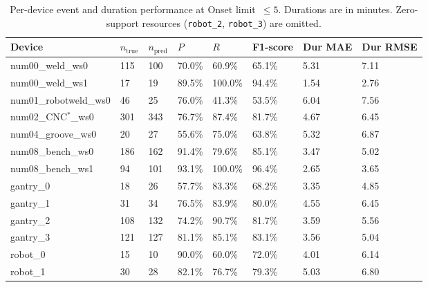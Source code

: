 \begin{table}[pos=!tbp]
\centering
\scriptsize
\setlength{\tabcolsep}{3pt}
\renewcommand{\arraystretch}{1.12}
\caption{Per-device event and duration performance at Onset limit~$\leq5$. Durations are in minutes. Zero-support resources (\texttt{robot\_2}, \texttt{robot\_3}) are omitted.}
\label{tab:complete-6-1}
\begin{tabularx}{\textwidth}{@{}lXXXXXXX@{}}
\toprule
Device & $n_{\mathrm{true}}$ & $n_{\mathrm{pred}}$ & $P$ & $R$ & F1-score & Dur MAE & Dur RMSE \\
\midrule
num00\_weld\_ws0 & 115 & 100 & 70.0\% & 60.9\% & 65.1\% & 5.31 & 7.11 \\
num00\_weld\_ws1 & 17 & 19 & 89.5\% & 100.0\% & 94.4\% & 1.54 & 2.76 \\
num01\_robotweld\_ws0 & 46 & 25 & 76.0\% & 41.3\% & 53.5\% & 6.04 & 7.56 \\
num02\_CNC$^\ast$\_ws0 & 301 & 343 & 76.7\% & 87.4\% & 81.7\% & 4.67 & 6.45 \\
num04\_groove\_ws0 & 20 & 27 & 55.6\% & 75.0\% & 63.8\% & 5.32 & 6.87 \\
num08\_bench\_ws0 & 186 & 162 & 91.4\% & 79.6\% & 85.1\% & 3.47 & 5.02 \\
num08\_bench\_ws1 & 94 & 101 & 93.1\% & 100.0\% & 96.4\% & 2.65 & 3.65 \\
gantry\_0 & 18 & 26 & 57.7\% & 83.3\% & 68.2\% & 3.35 & 4.85 \\
gantry\_1 & 31 & 34 & 76.5\% & 83.9\% & 80.0\% & 4.55 & 6.45 \\
gantry\_2 & 108 & 132 & 74.2\% & 90.7\% & 81.7\% & 3.59 & 5.56 \\
gantry\_3 & 121 & 127 & 81.1\% & 85.1\% & 83.1\% & 3.56 & 5.04 \\
robot\_0 & 15 & 10 & 90.0\% & 60.0\% & 72.0\% & 4.01 & 6.14 \\
robot\_1 & 30 & 28 & 82.1\% & 76.7\% & 79.3\% & 5.03 & 6.80 \\
\bottomrule
\end{tabularx}
\end{table}
